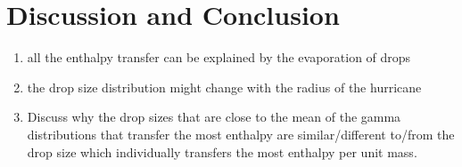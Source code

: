 \documentclass[10pt,a4paper]{article}
\begin{document}
\section{Discussion and Conclusion}
\begin{enumerate}
\item all the enthalpy transfer can be explained by the evaporation of drops
\item the drop size distribution might change with the radius of the hurricane
\item Discuss why the drop sizes that are close to the mean of the gamma distributions that transfer the most enthalpy are similar/different to/from the drop size which individually transfers the most enthalpy per unit mass.
\end{enumerate}

\newpage



\end{document}

